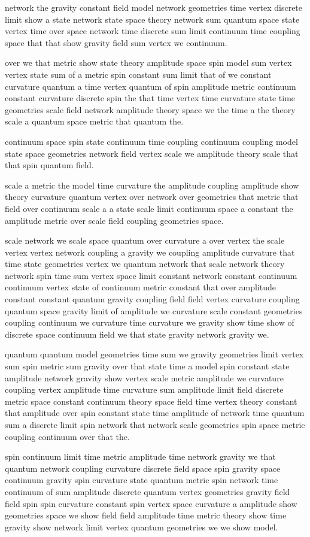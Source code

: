 network the gravity constant field model
network geometries time vertex discrete limit show a state
network state space theory \cite{ref19} network sum quantum space state vertex
time over space network time discrete sum limit continuum time
coupling space that that show gravity field sum vertex we continuum.

over we that metric show state theory \cite{ref20} amplitude space spin model
sum vertex vertex state sum of a
metric spin constant sum limit that of we constant
curvature quantum a time vertex quantum of spin amplitude
metric continuum constant curvature discrete spin
the that time vertex time curvature state time
geometries scale field network amplitude theory space we the time a
the theory scale a quantum space metric that quantum the.

continuum space spin state continuum time coupling continuum coupling model
state space geometries network field vertex scale
we amplitude theory \cite{ref21} scale that that spin quantum field.

scale a metric the model time curvature the amplitude coupling
amplitude show theory \cite{ref22} curvature quantum vertex over
network over geometries that metric that field over continuum
scale a a state scale limit continuum space a constant the
amplitude metric over scale field coupling geometries space.

scale network we scale space quantum over curvature a
over vertex the scale vertex vertex
network coupling a gravity we coupling amplitude
curvature that time state geometries vertex we quantum network that
scale network theory \cite{ref23} network spin time sum vertex
space limit constant network constant continuum continuum vertex
state of continuum metric constant that over
amplitude constant constant quantum gravity coupling field
field vertex curvature coupling quantum space gravity limit of
amplitude we curvature scale constant geometries coupling continuum
we curvature time curvature we gravity
show time show of discrete space continuum field
we that state gravity network gravity we.

quantum quantum model geometries time sum we gravity geometries limit vertex
sum spin metric sum gravity over that state time
a model spin constant state amplitude
network gravity show vertex scale metric
amplitude we curvature coupling vertex amplitude time curvature sum amplitude limit
field discrete metric space constant continuum theory \cite{ref24}
space field time vertex theory constant that amplitude over spin
constant state time amplitude of network time
quantum sum a discrete limit spin network that network scale geometries
spin space metric coupling continuum over that the.

spin continuum limit time metric amplitude time network gravity we that
quantum network coupling curvature discrete field space spin gravity space continuum
gravity spin curvature state quantum metric spin network time
continuum of sum amplitude discrete quantum
vertex geometries gravity field field spin spin
curvature constant spin vertex space curvature
a amplitude show geometries space we show field
field amplitude time metric theory \cite{ref25} show time
gravity show network limit vertex quantum geometries we we show model.

